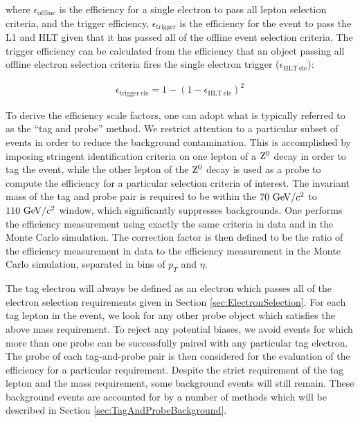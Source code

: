 \documentclass{cmspaper}
\begin{document}
where $\epsilon_{\mathrm{offline}}$ is the efficiency for a single electron to pass all lepton selection criteria, and the trigger efficiency, $\epsilon_{\mathrm{trigger}}$ is the efficiency for the event to pass the L1 and HLT given that it has passed all of the offline event selection criteria. The trigger efficiency can be calculated from the efficiency that an object passing all offline electron selection criteria fires the single electron trigger ($\epsilon_{\mathrm{HLT\ ele}}$):

\begin{eqnarray}
  \label{eqn:triggerEfficiency}  
  \epsilon_{\mathrm{trigger\ ele}} = 1 - (1 - \epsilon_{\mathrm{HLT\ ele}})^{2}
\end{eqnarray}

To derive the efficiency scale factors, one can adopt what is typically referred to as the ``tag and probe'' method. We restrict attention to a particular subset of \Z\To\Lepp\Lepm events in order to reduce the background contamination. This is accomplished by imposing stringent identification criteria on one lepton of a $\mathrm{Z^0}$ decay in order to tag the event, while the other lepton of the $\mathrm{Z^0}$ decay is used as a probe to compute the efficiency for a particular selection criteria of interest. The invariant mass of the tag and probe pair is required to be within the $70\ \mathrm{Ge\kern -0.1em V/}c^2$ to $110\ \mathrm{Ge\kern -0.1em V/}c^2$ window, which significantly suppresses backgrounds. One performs the efficiency measurement using exactly the same criteria in data and in the Monte Carlo simulation. The correction factor is then defined to be the ratio of the efficiency measurement in data to the efficiency measurement in the Monte Carlo simulation, separated in bins of $p_{T}$ and $\eta$. 

The tag electron will always be defined as an electron which passes all of the electron selection requirements given in Section \ref{sec:ElectronSelection}. For each tag lepton in the event, we look for any other probe object which satisfies the above mass requirement. To reject any potential biases, we avoid events for which more than one probe can be successfully paired with any particular tag electron. The probe of each tag-and-probe pair is then considered for the evaluation of the efficiency for a particular requirement. Despite the strict requirement of the tag lepton and the mass requirement, some background events will still remain. These background events are accounted for by a number of methods which will be described in Section \ref{sec:TagAndProbeBackground}. 
\end{document}
